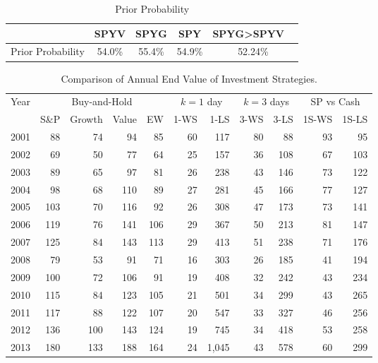 \documentclass{article}
\begin{document}
\begin{table}[!ht]
    \centering
    \caption{Prior Probability}
    \begin{tabular}{lccc|c} 
    \hline
         & SPYV & SPYG & SPY & SPYG\textgreater SPYV \ \\ \hline
        Prior Probability & 54.0\% & 55.4\% & 54.9\% & 52.24\% \\ \hline
    \end{tabular}
    \label{tab_pp}
\end{table}





\begin{table}[!ht]
    \centering
    \caption{Comparison of Annual End Value of Investment Strategies.}
    \medskip
    \begin{tabular}{l | rrrr | rr | rr| rr}
    \hline
\multirow{2}{*}{Year} & \multicolumn{4}{c|}{Buy-and-Hold}   
& \multicolumn{2}{c|}{$k=1$  day}  & \multicolumn{2}{c}{$k=3$ days} & \multicolumn{2}{c}{SP vs Cash}  \\
  & S\&P & Growth & Value &EW & 1-WS & 1-LS & 3-WS & 3-LS & 1S-WS & 1S-LS \\ \hline
        2001 & 88 & 74 & 94 & 85 & 60 & 117 & 80 & 88 & 93 & 95 \\ 
        2002 & 69 & 50 & 77 & 64 & 25 & 157 & 36 & 108 & 67 & 103 \\ 
        2003 & 89 & 65 & 97 & 81 & 26 & 238 & 43 & 146 & 73 & 122 \\ 
        2004 & 98 & 68 & 110 & 89 & 27 & 281 & 45 & 166 & 77 & 127 \\ 
        2005 & 103 & 70 & 116 & 92 & 26 & 308 & 47 & 173 & 73 & 141 \\ 
        2006 & 119 & 76 & 141 & 106 & 29 & 367 & 50 & 213 & 81 & 147 \\ 
        2007 & 125 & 84 & 143 & 113 & 29 & 413 & 51 & 238 & 71 & 176 \\ 
        2008 & 79 & 53 & 91 & 71 & 16 & 303 & 26 & 185 & 41 & 194 \\ 
        2009 & 100 & 72 & 106 & 91 & 19 & 408 & 32 & 242 & 43 & 234 \\ 
        2010 & 115 & 84 & 123 & 105 & 21 & 501 & 34 & 299 & 43 & 265 \\ 
        2011 & 117 & 88 & 122 & 107 & 20 & 547 & 33 & 327 & 46 & 256 \\ 
        2012 & 136 & 100 & 143 & 124 & 19 & 745 & 34 & 418 & 53 & 258 \\ 
        2013 & 180 & 133 & 188 & 164 & 24 & 1,045 & 43 & 578 & 60 & 299 \\ 

\end{tabular}
\end{table}
\end{document}
